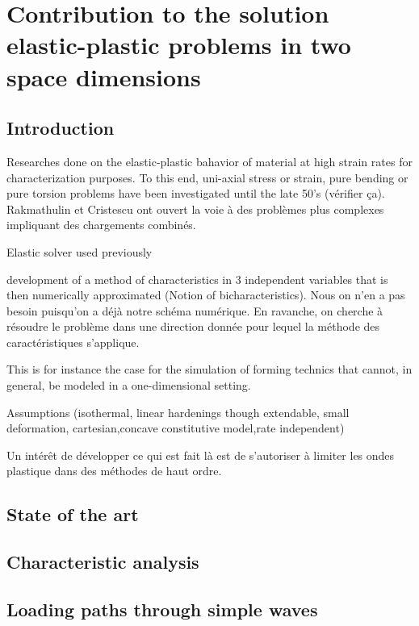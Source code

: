 \chapter{Contribution to the solution elastic-plastic problems in two space dimensions}

\section*{Introduction}
Researches done on the elastic-plastic bahavior of material at high strain rates for characterization purposes. To this end, uni-axial stress or strain, pure bending or pure torsion problems have been investigated until the late 50's (vérifier ça). Rakmathulin et Cristescu ont ouvert la voie à des problèmes plus complexes impliquant des chargements combinés.

Elastic solver used previously

\cite{Clifton_thesis} development of a method of characteristics in 3 independent variables that is then numerically approximated (Notion of bicharacteristics). Nous on n'en a pas besoin puisqu'on a déjà notre schéma numérique. En ravanche, on cherche à résoudre le problème dans une direction donnée pour lequel la méthode des caractéristiques s'applique.

This is for instance the case for the simulation of forming technics that cannot, in general, be modeled in a one-dimensional setting.

Assumptions (isothermal, linear hardenings though extendable, small deformation, cartesian,concave constitutive model,rate independent)

Un intérêt de développer ce qui est fait là est de s'autoriser à limiter les ondes plastique dans des méthodes de haut ordre.
\section{State of the art}


\section{Characteristic analysis}


\section{Loading paths through simple waves}


